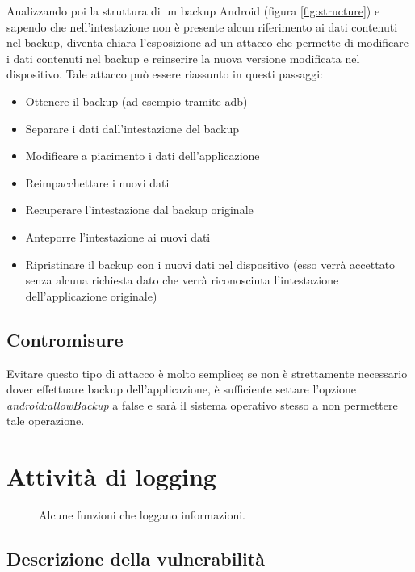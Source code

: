 Analizzando poi la struttura di un backup Android (figura \ref{fig:structure}) e sapendo che nell'intestazione non è presente alcun riferimento ai dati contenuti nel backup, diventa chiara l'esposizione ad un attacco che permette di modificare i dati contenuti nel backup e reinserire la nuova versione modificata nel dispositivo. Tale attacco può essere riassunto in questi passaggi:

\begin{itemize}
	\item Ottenere il backup (ad esempio tramite adb)
	\item Separare i dati dall'intestazione del backup
	\item Modificare a piacimento i dati dell'applicazione
	\item Reimpacchettare i nuovi dati
	\item Recuperare l'intestazione dal backup originale
	\item Anteporre l'intestazione ai nuovi dati
	\item Ripristinare il backup  con i nuovi dati nel dispositivo (esso verrà accettato senza alcuna richiesta dato che verrà riconosciuta l'intestazione dell'applicazione originale)
\end{itemize}

\subsection{Contromisure}

Evitare questo tipo di attacco è molto semplice; se non è strettamente necessario dover effettuare backup dell'applicazione, è sufficiente settare l'opzione \emph{android:allowBackup} a false e sarà il sistema operativo stesso a non permettere tale operazione.

\section{Attività di logging}

\begin{figure}[h]
	\centering 
	\caption{Alcune funzioni che loggano informazioni.}
	\label{fig:log}
\end{figure}

\subsection{Descrizione della vulnerabilità}

